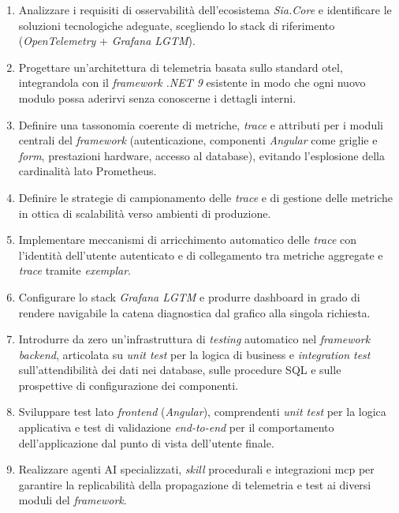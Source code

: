 \begin{enumerate}[label=\arabic*.]
      \item Analizzare i requisiti di osservabilità dell'ecosistema \emph{Sia.Core} e
            identificare le soluzioni tecnologiche adeguate, scegliendo lo stack di
            riferimento (\emph{OpenTelemetry} + \emph{Grafana LGTM}).
      \item Progettare un'architettura di telemetria basata sullo standard \gls{otel},
            integrandola con il \emph{framework} \emph{.NET 9} esistente in modo che ogni
            nuovo modulo possa aderirvi senza conoscerne i dettagli interni.
      \item Definire una tassonomia coerente di metriche, \emph{trace} e attributi per i
            moduli centrali del \emph{framework} (autenticazione, componenti \emph{Angular}
            come griglie e \emph{form}, prestazioni hardware, accesso al database),
            evitando l'esplosione della cardinalità lato Prometheus.
      \item Definire le strategie di campionamento delle \emph{trace} e di gestione delle
            metriche in ottica di scalabilità verso ambienti di produzione.
      \item Implementare meccanismi di arricchimento automatico delle \emph{trace} con
            l'identità dell'utente autenticato e di collegamento tra metriche aggregate e
            \emph{trace} tramite \emph{exemplar}.
      \item Configurare lo stack \emph{Grafana LGTM} e produrre dashboard in grado di
            rendere navigabile la catena diagnostica dal grafico alla singola richiesta.
      \item Introdurre da zero un'infrastruttura di \emph{testing} automatico nel
            \emph{framework} \emph{backend}, articolata su \emph{unit test} per la logica
            di business e \emph{integration test} sull'attendibilità dei dati nei
            database, sulle procedure SQL e sulle prospettive di configurazione dei
            componenti.
      \item Sviluppare test lato \emph{frontend} (\emph{Angular}), comprendenti
            \emph{unit test} per la logica applicativa e test di validazione
            \emph{end-to-end} per il comportamento dell'applicazione dal punto di vista
            dell'utente finale.
      \item Realizzare agenti AI specializzati, \emph{skill} procedurali e integrazioni
            \gls{mcp} per garantire la replicabilità della propagazione di telemetria e
            test ai diversi moduli del \emph{framework}.
\end{enumerate}

